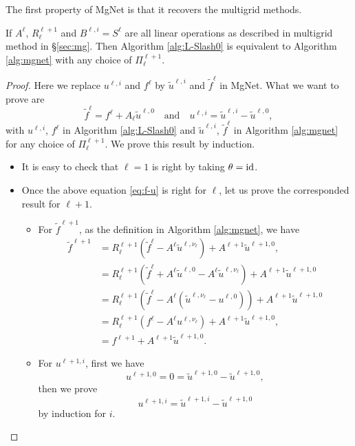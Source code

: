 The first property of MgNet is that it recovers the multigrid methods.
\begin{theorem}
	If $A^\ell$, $R_\ell^{\ell+1}$ and $B^{\ell,i} = S^{\ell}$ are all linear operations as described in multigrid method
	in \S \ref{sec:mg}. 
	Then Algorithm \ref{alg:L-Slash0} is equivalent to Algorithm \ref{alg:mgnet} with any choice of $\Pi_\ell^{\ell+1}$.
\end{theorem}
\begin{proof}
	Here we replace $u^{\ell,i}$ and $f^{\ell}$ by $\tilde u^{\ell,i}$ and $\tilde f^{\ell}$ in MgNet. 
	What we want to prove are
	\begin{equation}\label{eq:f-u}
	\tilde f^{\ell} =  f^{\ell} + A_\ell \tilde u^{\ell,0} \quad \text{and} \quad u^{\ell,i} = \tilde u^{\ell, i} - \tilde u^{\ell, 0},
	\end{equation}
	with $u^{\ell,i}$, $f^\ell$ in Algorithm \ref{alg:L-Slash0} and 
	$\tilde u^{\ell,i}$, $\tilde f^\ell$ in Algorithm \ref{alg:mgnet} for any choice of $\Pi_\ell^{\ell+1}$. 
	We prove this result by induction. 
	\begin{itemize}
		\item It is easy to check that $\ell = 1$ is right by taking $\theta  = \rm{id}$. 
		\item Once the above equation \eqref{eq:f-u} is right for $\ell$, 
		let us prove the corresponded result for $\ell+1$.
		\begin{itemize}
			\item For $\tilde f^{\ell+1}$, as the definition in Algorithm \ref{alg:mgnet}, we have
			\begin{align*}
			\tilde f^{\ell+1} &= R_\ell^{\ell+1}(\tilde f^\ell - A^\ell \tilde u^{\ell,\nu_\ell}) + A^{\ell+1}\tilde u^{\ell+1,0}, \\
			&= R_\ell^{\ell+1}(\tilde f^\ell + A^{\ell} \tilde u^{\ell,0}- A^{\ell} \tilde u^{\ell,\nu_\ell}) + A^{\ell+1}\tilde u^{\ell+1,0} \\
			&= R_\ell^{\ell+1}(\tilde f^\ell - A^{\ell} (\tilde u^{\ell,\nu_\ell}- u^{\ell,0})) + A^{\ell+1}\tilde u^{\ell+1,0} \\
			&= R_\ell^{\ell+1}(f^\ell - A^{\ell} u^{\ell,\nu_\ell}) + A^{\ell+1}\tilde u^{\ell+1,0}, \\
			&=  f^{\ell+1} + A^{\ell+1}\tilde u^{\ell+1,0}.
			\end{align*}
			\item For $u^{\ell+1,i}$, first we have 
			$$
			u^{\ell+1,0} = 0 =\tilde u^{\ell+1, 0} - \tilde u^{\ell+1, 0},
			$$
			then we prove 
			\begin{equation}\label{u:i+1}
			u^{\ell+1,i} = \tilde u^{\ell+1, i} - \tilde u^{\ell+1, 0}
			\end{equation} by induction for $i$.
	

\end{itemize}
\end{itemize}
\end{proof}

